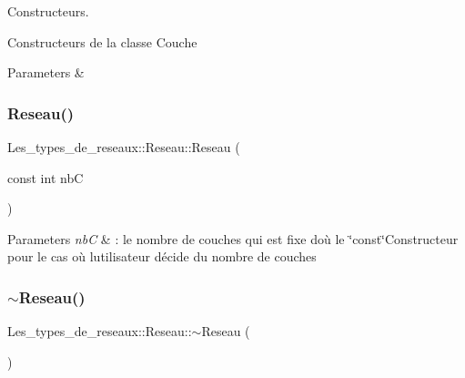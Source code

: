 Constructeurs. 

Constructeurs de la classe Couche


\begin{DoxyParams}{Parameters}
{\em } & \\
\hline
\end{DoxyParams}
\mbox{\label{class_les__types__de__reseaux_1_1_reseau_a519ad4b3e43d46c5840a9d5196fda003}} 
\subsubsection{\texorpdfstring{Reseau()}{Reseau()}\hspace{0.1cm}{\footnotesize\ttfamily [2/2]}}
{\footnotesize\ttfamily Les\+\_\+types\+\_\+de\+\_\+reseaux\+::\+Reseau\+::\+Reseau (\begin{DoxyParamCaption}\item[{const int}]{nbC }\end{DoxyParamCaption})\hspace{0.3cm}{\ttfamily [protected]}}


\begin{DoxyParams}{Parameters}
{\em nbC} & \+: le nombre de couches qui est fixe d\textquotesingle{}où le \char`\"{}const\char`\"{}Constructeur pour le cas où l\textquotesingle{}utilisateur décide du nombre de couches \\
\hline
\end{DoxyParams}
\mbox{\label{class_les__types__de__reseaux_1_1_reseau_ac0ff95d39205854ba7bde14d2edba454}} 
\subsubsection{\texorpdfstring{$\sim$\+Reseau()}{~Reseau()}}
{\footnotesize\ttfamily Les\+\_\+types\+\_\+de\+\_\+reseaux\+::\+Reseau\+::$\sim$\+Reseau (\begin{DoxyParamCaption}{ }\end{DoxyParamCaption})\hspace{0.3cm}{\ttfamily [protected]}}



